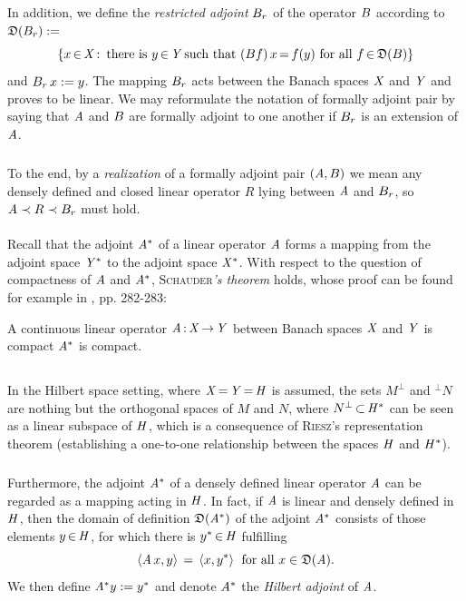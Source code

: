 \documentclass[11pt,twoside]{article}
\begin{document}
\subparagraph{} %
In addition,
we define the \textit{restricted adjoint} ${B}_r$
of the operator ${B}$ according to $\mathfrak{D}({B}_r) :=$
\[
\{ x {\,\in\,} \mathit{X} {\,:\,} \mbox{ there is } y {\,\in\,} \mathit{Y}\,\mbox{such that }
({B} f)\,x {\,=\,} f(y) \mbox{ for all } f {\,\in\,} \mathfrak{D}({B}) \}
\]
and ${B}_r \, x := y$.
The mapping ${B}_r$ acts between the Banach spaces $\mathit{X}$ and $\mathit{Y}$
and proves to be linear.
We may reformulate the notation of {formally adjoint pair} by saying that
$\mathit{A}$ and ${B}$ are formally adjoint to one another
if ${B}_r$ is an extension of $\mathit{A}$.

\subparagraph{} %
To the end,
by a \textit{realization} of a formally adjoint pair $(\mathit{A},{B})$
we mean any densely defined and closed linear operator $R$
lying between $\mathit{A}$ and ${B}_r$,
so $\mathit{A} \prec R \prec {B}_r$ must hold.

\paragraph{} %
Recall that the adjoint $\mathit{A}^*$ of a linear operator $\mathit{A}$ forms
a mapping from the adjoint space $\mathit{Y}^*$ to the adjoint space $\mathit{X}^*$.
With respect to the question of compactness of $\mathit{A}$ and $\mathit{A}^*$,
\textsc{Schauder}\textit{'s theorem} holds,
whose proof can be found for example in \cite{Yo}, pp. 282-283:

\begin{theorem}
A continuous linear operator $\mathit{A} {\,:\,} \mathit{X} {\,\to\,} \mathit{Y}$
between Banach spaces $\mathit{X}$ and $\mathit{Y}$ is compact
\iff $\mathit{A}^*$ is compact.
\end{theorem}

\subsection{} %
In the Hilbert space setting,
where $\mathit{X} {\,=\,} \mathit{Y} {\,=\,} \mathit{H}$ is assumed,
the sets $M^{\bot}$ and $^{\bot}N$ are nothing
but the orthogonal spaces of $M$ and $N$,
where $N^{\bot} {\,\subset\,} \mathit{H}^*$ can be seen as a linear subspace of $\mathit{H}$,
which is a consequence of \textsc{Riesz}'s representation theorem
(establishing a one-to-one relationship
between the spaces $\mathit{H}$ and $\mathit{H}^*$).

\subparagraph{} %
Furthermore,
the adjoint $\mathit{A}^*$ of a densely defined linear operator $\mathit{A}$
can be regarded as a mapping acting in $\mathit{H}$.
In fact,
if $\mathit{A}$ is linear and densely defined in $\mathit{H}$,
then the domain of definition $\mathfrak{D}(\mathit{A}^*)$
of the adjoint $\mathit{A}^*$ consists of those elements $y {\,\in\,} \mathit{H}$,
for which there is $y^* {\,\in\,} \mathit{H}$ fulfilling
\[
\langle \mathit{A} \,x,y \rangle \,=\, \langle x,y^* \rangle \; \mbox{ for all } x \in \mathfrak{D}(\mathit{A}).
\]
We then define $\mathit{A}^* y := y^*$ and denote $\mathit{A}^*$
the \textit{Hilbert adjoint} of $\mathit{A}$.
\end{document}
